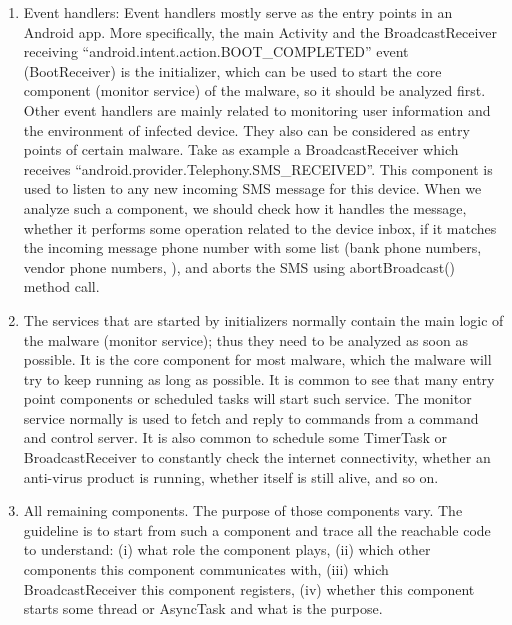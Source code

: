 \begin{enumerate}[label=\alph*)]

\item Event handlers:
Event handlers mostly serve as the entry points in an Android app.
More specifically,
the main Activity and 
the BroadcastReceiver receiving \mbox{``android.intent.action.BOOT_COMPLETED''} event \linebreak
(\mbox{BootReceiver})
is the initializer, which can be used to start the core component (\eg monitor service) of the malware,
so it should be analyzed first.
Other event handlers are mainly related to monitoring user information and
the environment of infected device.
They also can be considered as entry points of certain malware.
Take as example a BroadcastReceiver which receives
``android.provider.Telephony.SMS_RECEIVED''. This component is used
to listen to any new incoming SMS message for this device. When we analyze such a component,
we should check how it handles the message, whether it performs some operation related to the device inbox,
if it matches the incoming message phone number with some list
(\eg bank phone numbers, vendor phone numbers, \etc), and aborts the SMS using
abortBroadcast() method call.

\item The services that are started by initializers normally contain the main logic of the
malware (monitor service); thus they need to be analyzed as soon as possible.
It is the core component for most malware, which the malware will try
to keep running as long as possible. It is common to see that many entry point components
or scheduled tasks will start such service. 
The monitor service normally is used to fetch and reply to commands from
a command and control server. It is also common to schedule some TimerTask or BroadcastReceiver
to constantly check the internet connectivity, whether an anti-virus product is running,
whether itself is still alive, and so on.

\item All remaining components.
The purpose of those components vary. The guideline is to
start from such a component and
trace all the reachable code to understand: 
(i) what role the component plays, 
(ii) which other components this component communicates with,
(iii) which BroadcastReceiver this component registers, 
(iv) whether this component starts some thread or AsyncTask and what is the purpose.
\end{enumerate}


